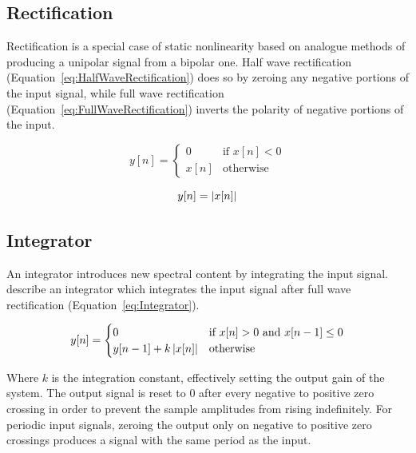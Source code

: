 	\subsection{Rectification}
	\label{sec:Excitation-Methods-Rectification}
		Rectification is a special case of static nonlinearity based on analogue methods of producing a unipolar
		signal from a bipolar one. Half wave rectification (Equation~\ref{eq:HalfWaveRectification}) does so by
		zeroing any negative portions of the input signal, while full wave rectification
		(Equation~\ref{eq:FullWaveRectification}) inverts the polarity of negative portions of the input.

		\begin{equation}
			y[n] = \begin{cases}
				0 & \text{if $x[n] < 0$} \\
				x[n] & \text{otherwise}
			\end{cases}
			\label{eq:HalfWaveRectification}
		\end{equation}

		\begin{equation}
			y[n] = \left|x[n]\right|
			\label{eq:FullWaveRectification}
		\end{equation}

	\subsection{Integrator}
	\label{sec:Excitation-Methods-Integrator}
		An integrator introduces new spectral content by integrating the input signal. \citet{larsen2004audio}
		describe an integrator which integrates the input signal after full wave rectification
		(Equation~\ref{eq:Integrator}).

		\begin{equation}
			y[n] = \begin{cases}
				0 & \text{if $x[n] > 0$ and $x[n - 1] \leq 0$} \\
				y[n - 1] + k\left|x[n]\right| & \text{otherwise}
			\end{cases}
			\label{eq:Integrator}
		\end{equation}

		Where $k$ is the integration constant, effectively setting the output gain of the system. The output signal
		is reset to 0 after every negative to positive zero crossing in order to prevent the sample amplitudes from
		rising indefinitely. For periodic input signals, zeroing the output only on negative to positive zero
		crossings produces a signal with the same period as the input.

